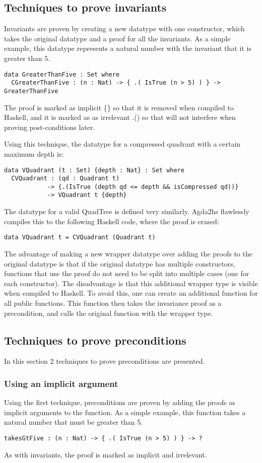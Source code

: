 \subsection{Techniques to prove invariants}
Invariants are proven by creating a new datatype with one constructor, which takes the original datatype and a proof for all the invariants. As a simple example, this datatype represents a natural number with the invariant that it is greater than 5.
\begin{verbatim}
data GreaterThanFive : Set where
  CGreaterThanFive : (n : Nat) -> { .( IsTrue (n > 5) ) } -> GreaterThanFive
\end{verbatim}
The proof is marked as implicit \{\} so that it is removed when compiled to Haskell, and it is marked as as irrelevant .() so that will not interfere when proving post-conditions later. 

Using this technique, the datatype for a compressed quadrant with a certain maximum depth is: 
\begin{verbatim}
data VQuadrant (t : Set) {depth : Nat} : Set where
  CVQuadrant : (qd : Quadrant t) 
            -> {.(IsTrue (depth qd <= depth && isCompressed qd))} 
            -> VQuadrant t {depth}
\end{verbatim}
The datatype for a valid QuadTree is defined very similarly. Agda2hs flawlessly compiles this to the following Haskell code, where the proof is erased:
\begin{verbatim}
data VQuadrant t = CVQuadrant (Quadrant t)
\end{verbatim}

The advantage of making a new wrapper datatype over adding the proofs to the original datatype is that if the original datatype has multiple constructors, functions that use the proof do not need to be split into multiple cases (one for each constructor). The disadvantage is that this additional wrapper type is visible when compiled to Haskell. To avoid this, one can create an additional function for all public functions. This function then takes the invariance proof as a precondition, and calls the original function with the wrapper type. 

\subsection{Techniques to prove preconditions}
In this section 2 techniques to prove preconditions are presented.

\subsubsection{Using an implicit argument}
Using the first technique, preconditions are proven by adding the proofs as implicit arguments to the function.
As a simple example, this function takes a natural number that must be greater than 5.
\begin{verbatim}
takesGtFive : (n : Nat) -> { .( IsTrue (n > 5) ) } -> ?
\end{verbatim}
As with invariants, the proof is marked as implicit and irrelevant. 

